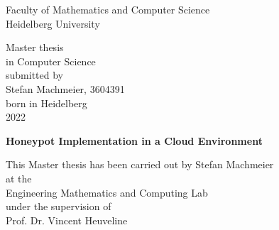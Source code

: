 \thispagestyle{empty}
\begin{center}
  \renewcommand{\baselinestretch}{2.00}
  \Large%
  Faculty of Mathematics and Computer Science\\
  \large Heidelberg University
  \par\vfill\normalfont
  Master thesis\\
  in Computer Science\\
  submitted by\\
  Stefan Machmeier, 3604391\\
  born in Heidelberg\\
  2022
\end{center}
\newpage

\thispagestyle{empty}
\begin{center}
  \renewcommand{\baselinestretch}{2.00}
  \Large\bfseries%
    Honeypot Implementation in a Cloud Environment
  \par
  \vfill
  \large\normalfont
  This Master thesis has been carried out by Stefan Machmeier\\
  at the\\
  Engineering Mathematics and Computing Lab\\
  under the supervision of\\
  Prof. Dr. Vincent Heuveline
\end{center}\par
\vspace{5\baselineskip}

\renewcommand{\baselinestretch}{1.00}\normalsize
